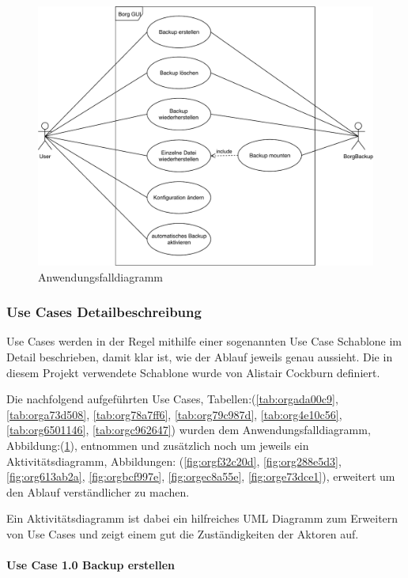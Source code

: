 \newpage
\begin{landscape}
\begin{figure}[htbp]
\centering
\includegraphics[width=.9\linewidth]{pictures/use_case.pdf}
\caption{\label{fig:org49a405a}
Anwendungsfalldiagramm}
\end{figure}
\end{landscape}
\newpage

\subsubsection{Use Cases Detailbeschreibung}
\label{sec:org7eb46b4}

Use Cases werden in der Regel mithilfe einer sogenannten Use Case Schablone im
Detail beschrieben, damit klar ist, wie der Ablauf jeweils genau aussieht. Die
in diesem Projekt verwendete Schablone wurde von Alistair Cockburn definiert.

Die nachfolgend aufgeführten Use Cases, Tabellen:(\ref{tab:orgada00c9}, \ref{tab:orga73d508},
\ref{tab:org78a7ff6}, \ref{tab:org79c987d}, \ref{tab:org4e10c56}, \ref{tab:org6501146}, \ref{tab:orgc962647})
wurden dem Anwendungsfalldiagramm, Abbildung:(\ref{fig:org49a405a}), entnommen und
zusätzlich noch um jeweils ein Aktivitätsdiagramm, Abbildungen:
(\ref{fig:orgf32c20d}, \ref{fig:org288e5d3}, \ref{fig:org613ab2a},
\ref{fig:orgbcf997e}, \ref{fig:orgec8a55e}, \ref{fig:orge73dce1}), erweitert
um den Ablauf verständlicher zu machen.

Ein Aktivitätsdiagramm ist dabei ein hilfreiches UML Diagramm zum Erweitern von
Use Cases und zeigt einem gut die Zuständigkeiten der Aktoren auf.

\paragraph{Use Case 1.0 Backup erstellen}
\label{sec:orgf1b47d8}

